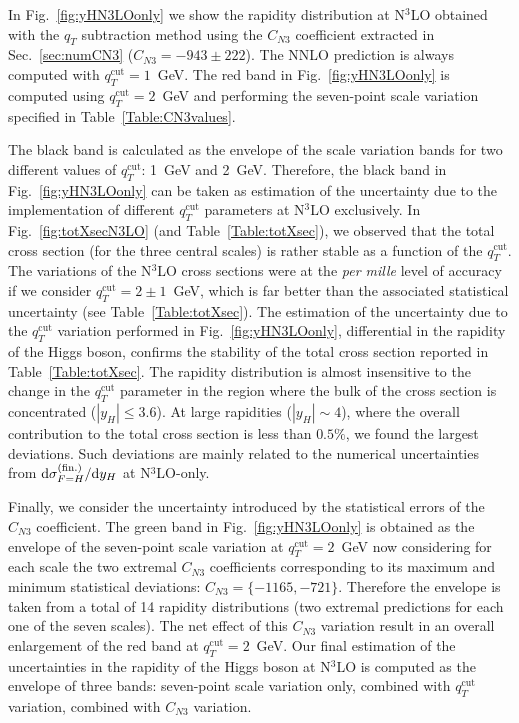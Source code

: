 \documentclass[12pt]{article}
\DeclareRobustCommand{\qt}{q_T}
\DeclareRobustCommand{\qtcut}{\ensuremath{q_T^\mathrm{cut}}}
\DeclareRobustCommand{\rd}{\ensuremath{\mathrm{d}}}
\begin{document}
In Fig.~\ref{fig:yHN3LOonly} we show the rapidity distribution at N$^{3}$LO obtained with the $\qt$ subtraction method using the $C_{N3}$ coefficient extracted in Sec.~\ref{sec:numCN3} ($C_{N3}=-943 \pm 222$). The NNLO prediction is always computed with $\qtcut=1$~GeV. 
The red band in Fig.~\ref{fig:yHN3LOonly} is computed using $\qtcut=2$~GeV and performing the seven-point scale variation specified in Table~\ref{Table:CN3values}. 

The black band is calculated as the envelope of the scale variation  bands for two different values of $\qtcut$: 1~GeV and 2~GeV. Therefore, the black band in Fig.~\ref{fig:yHN3LOonly} can be taken as estimation of the uncertainty due to the implementation of different $\qtcut$ parameters at N$^{3}$LO exclusively. In Fig.~\ref{fig:totXsecN3LO} (and Table~\ref{Table:totXsec}), we observed that the total cross section (for the three central scales) is rather stable as a function of the $\qtcut$. The variations of the N$^{3}$LO cross sections were at the \textit{per mille} level of accuracy if we consider  $\qtcut=2 \pm 1$~GeV, which is far better than the associated statistical uncertainty (see Table~\ref{Table:totXsec}). The estimation of the uncertainty due to the $\qtcut$ variation performed in Fig.~\ref{fig:yHN3LOonly}, differential in the rapidity of the Higgs boson, confirms the stability of the total cross section reported in Table~\ref{Table:totXsec}. 
The rapidity distribution is almost insensitive to the change in the $\qtcut$ parameter in the region where
 the bulk of the cross section is concentrated ($|y_{H}| \leq 3.6$). At large rapidities ($|y_{H}| \sim 4$), where the overall contribution to the total cross section is less than $0.5\%$, we found the largest deviations. Such deviations are mainly related to the numerical uncertainties from $\rd\sigma_{F=H}^{(\rm fin.)}/\rd y_H$ at  N$^3$LO-only.
 
Finally, we consider the uncertainty introduced by the statistical errors of the $C_{N3}$ coefficient. The green band in Fig.~\ref{fig:yHN3LOonly} is obtained as the envelope of the seven-point scale variation at $\qtcut=2$~GeV now considering for each scale the two extremal $C_{N3}$ coefficients corresponding to its maximum and minimum statistical deviations: $C_{N3} =\{-1165,-721\}$. Therefore the envelope is taken from a total of 14 rapidity distributions (two extremal predictions for each one of the seven scales). The net effect of this $C_{N3}$ variation result in an overall enlargement of the red band at $\qtcut=2$~GeV. Our final estimation of the uncertainties in the rapidity of the Higgs boson at N$^{3}$LO is computed as the envelope of three bands: seven-point scale  variation only, combined with $\qtcut$ variation,
combined with  $C_{N3}$ variation. 
\end{document}
